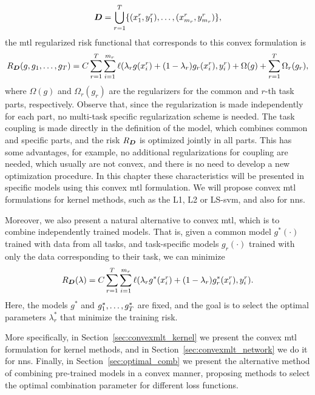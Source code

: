 $$\bm{D} = \bigcup_{r=1}^T \{(x_1^r, y_1^r), \ldots, (x_{m_r}^r, y_{m_r}^r)\},$$
the \acrshort{mtl} regularized risk functional that corresponds to this convex formulation is 
\begin{equation}
    \nonumber
    R_{\bm{D}} ({g, g_1, \ldots, g_T}) = C\sum_{r=1}^{T} \sum_{i=1}^{m_r} \ell(\lambda_r g(x_i^r) + (1 - \lambda_r) g_r(x_i^r), y_i^r) + \Omega(g) + \sum_{r=1}^T \Omega_r(g_r) ,
\end{equation}
where $\Omega(g)$ and $\Omega_r(g_r)$ are the regularizers for the common and $r$-th task parts, respectively. Observe that, since the regularization is made independently for each part, no multi-task specific regularization scheme is needed. The task coupling is made directly in the definition of the model, which combines common and specific parts, and the risk $R_{\bm{D}}$ is optimized jointly in all parts.
This has some advantages, for example, no additional regularizations for coupling are needed, which usually are not convex, and there is no need to develop a new optimization procedure. In this chapter these characteristics will be presented in specific models using this convex \acrshort{mtl} formulation. We will propose convex \acrshort{mtl} formulations for kernel methods, such as the L1, L2 or LS-\acrfull{svm}, and also for \acrfull{nns}.
%

Moreover, we also present a natural alternative to convex \acrshort{mtl}, which is to combine independently trained models. That is, given a common model $g^*(\cdot)$ trained with data from all tasks, and task-specific models $g_r(\cdot)$ trained with only the data corresponding to their task, we can minimize 
\begin{equation}
    \nonumber
    R_{\bm{D}} (\lambda) = C\sum_{r=1}^{T} \sum_{i=1}^{m_r} \ell(\lambda_r g^*(x_i^r) + (1 - \lambda_r) g^*_r(x_i^r), y_i^r)  .
\end{equation}
Here, the models $g^*$ and $g^*_1, \ldots, g^*_T$ are fixed, and the goal is to select the optimal parameters $\lambda^*_r$ that minimize the training risk.

%
More specifically, in Section~\ref{sec:convexmlt_kernel} we present the convex \acrshort{mtl} formulation for kernel methods, and in Section~\ref{sec:convexmlt_network} we do it for \acrshort{nns}.
Finally, in Section~\ref{sec:optimal_comb} we present the alternative method of combining pre-trained models in a convex manner, proposing methods to select the optimal combination parameter for different loss functions.
%




